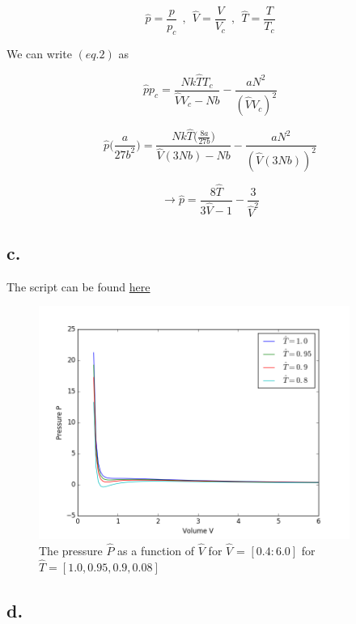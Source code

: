 \documentclass{article}
\begin{document}
\begin{equation*}
\hat{p} = \frac{p}{p_c} \ \ , \ \ \hat{V} = \frac{V}{V_c} \ \ , \ \ \hat{T} = \frac{T}{T_c}
\end{equation*}


We can write $(eq.2)$ as

\begin{equation*}
\hat{p}p_c = \frac{Nk\hat{T}T_c}{\hat{V}V_c - Nb} - \frac{aN^2}{(\hat{V}V_c)^2}
\end{equation*}

\begin{equation*}
\hat{p}\bigg(\frac{a}{27b^2}\bigg) = \frac{Nk\hat{T}\bigg(\frac{8a}{27b}\bigg)}{\hat{V}(3Nb) - Nb} - \frac{aN^2}{(\hat{V}(3Nb))^2}
\end{equation*}

\begin{equation}
\rightarrow \hat{p} = \frac{8\hat{T}}{3\hat{V} - 1} - \frac{3}{\hat{V}^2}
\end{equation}


\subsection*{c.}

The script can be found \hyperlink{code_problem_c}{here}

\begin{figure}[H]
    \centering
    \includegraphics[width=4in]{project_1/problem_c}
    \caption[Plot from problem c.]
    {The pressure $\hat{P}$ as a function of $\hat{V}$ for $\hat{V}$ = $[0.4:6.0]$ for $\hat{T} = [1.0, 0.95, 0.9,0.08]$}
\end{figure}


\subsection*{d.}
\end{document}
